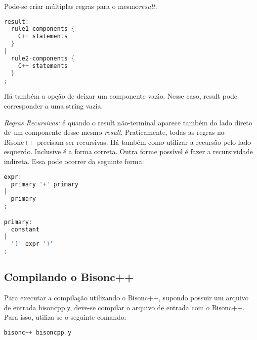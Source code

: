 \begin{apendicesenv}
\par 
\indent Pode-se criar múltiplas regras para o mesmo\textit{result}:

\begin{lstlisting}[language=c,  caption=Exemplo de Regra Gramatical Utilizando Múltiplas Regras]
result:
  rule1-components {
    C++ statements
  }
|
  rule2-components {
    C++ statements
  }
;
\end{lstlisting}

\par 
\indent Há também a opção de deixar um componente vazio. Nesse caso, result pode corresponder a uma string vazia.
\par 
\indent \textit{Regras Recursivas:} é quando o result não-terminal aparece também do lado direto de um componente desse mesmo \textit{result}. Praticamente, todas as regras no Bisonc++ precisam ser recursivas. Há também como utilizar a recursão pelo lado esquerdo. Inclusive é a forma correta. Outra forme possível é fazer a recursividade indireta. Essa pode ocorrer da seguinte forma:

\begin{lstlisting}[language=c,  caption=Exemplo de Regra Gramatical Utilizando Recursividade]
expr:     
  primary '+' primary
|
  primary
;

primary:
  constant
|
  '(' expr ')'
;
\end{lstlisting}

\subsection{Compilando o Bisonc++}
Para executar a compilação utilizando o Bisonc++, supondo possuir um arquivo de entrada bisoncpp.y, deve-se compilar o arquivo de entrada com o Bisonc++. Para isso, utiliza-se o seguinte comando:
\begin{lstlisting}[language=c,  caption=Comando para Compilação do Bisonc++]
bisonc++ bisoncpp.y
\end{lstlisting}


\end{apendicesenv}
